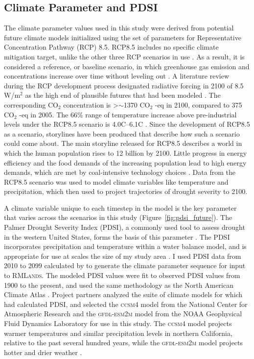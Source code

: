 \subsection*{Climate Parameter and PDSI}

The climate parameter values used in this study were derived from potential future climate models initialized using the set of parameters for Representative Concentration Pathway (RCP) 8.5. RCP8.5 includes no specific climate mitigation target, unlike the other three RCP scenarios in use \citep{Riahi2011}. As a result, it is considered a reference, or baseline scenario, in which greenhouse gas emission and concentrations increase over time without leveling out \citep{Riahi2011}. A literature review during the RCP development process designated radiative forcing in 2100 of 8.5 W/m$^2$ as the high end of plausible futures that had been modeled \citep{VanVuuren2011}. The corresponding $\text{CO}_2$ concentration is \textgreater $\sim$1370 $\text{CO}_2$ -eq in 2100, compared to 375 $\text{CO}_2$ -eq in 2005. The 66\% range of temperature increase above pre-industrial levels under the RCP8.5 scenario is 4.0\textdegree C--6.1\textdegree C \citep{Rogelj2012}. Since the development of RCP8.5 as a scenario, storylines have been produced that describe how such a scenario could come about. The main storyline released for RCP8.5 describes a world in which the human population rises to 12 billion by 2100. Little progress in energy efficiency and the food demands of the increasing population lead to high energy demands, which are met by coal-intensive technology choices \citep{Riahi2011}. Data from the RCP8.5 scenario was used to model climate variables like temperature and precipitation, which \citet{Cook2014} then used to project trajectories of drought severity to 2100.

A climate variable unique to each timestep in the model is the key parameter that varies across the scenarios in this study (Figure~\ref{fig:pdsi_future}). The Palmer Drought Severity Index (PDSI), a commonly used tool to assess drought in the western United States, forms the basis of this parameter \citep{Cooketal2004,Cook2004}. The PDSI incorporates precipitation and temperature within a water balance model, and is appropriate for use at scales the size of my study area \citep{HeimJr2002}. I used PDSI data from 2010 to 2099 calculated by \citet{Cook2014} to generate the climate parameter sequence for input to \textsc{RMLands}. The \citet{Cook2014} modeled PDSI values were fit to observed PDSI values from 1900 to the present, and used the same methodology as the North American Climate Atlas \citep{Cook2004}. Project partners analyzed the suite of climate models for which \citet{Cook2014} had calculated PDSI, and selected the \textsc{ccsm4} model from the National Center for Atmospheric Research and the \textsc{gfdl-esm2m} model from the NOAA Geophysical Fluid Dynamics Laboratory for use in this study. The \textsc{ccsm4} model projects warmer temperatures and similar precipitation levels in northern California, relative to the past several hundred years, while the \textsc{gfdl-esm2m} model projects hotter and drier weather \citep{Weiss2013}.

